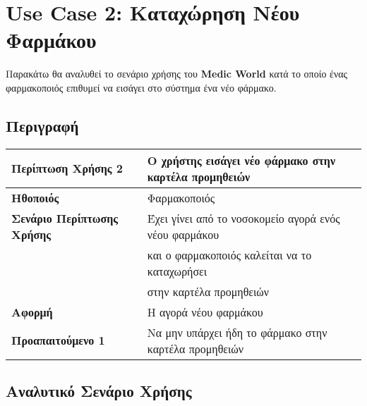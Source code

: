 \documentclass{article}
\newcommand\T{\rule{0pt}{2.6ex}}       %
\newcommand\B{\rule[-1.2ex]{0pt}{0pt}}
\begin{document}
\newpage

\section{Use Case 2: Καταχώρηση Νέου Φαρμάκου }
 
 Παρακάτω θα αναλυθεί το σενάριο χρήσης του \textbf{Medic World} κατά το οποίο ένας φαρμακοποιός επιθυμεί να εισάγει στο σύστημα ένα νέο φάρμακο.
 
\subsection{Περιγραφή}

\begin{center}
     \begin{tabular}{|l|l|}
     \hline
      \textbf{Περίπτωση Χρήσης 2} & Ο χρήστης εισάγει νέο φάρμακο στην καρτέλα προμηθειών \T\B \\ 
      \hline
      \textbf{Ηθοποιός} & Φαρμακοποιός \T\B \\
      \hline
      \textbf{Σενάριο Περίπτωσης Χρήσης} & Έχει γίνει από το νοσοκομείο αγορά ενός νέου φαρμάκου \T \\& και ο φαρμακοποιός καλείται να το καταχωρήσει \\& στην καρτέλα προμηθειών \B \\
      \hline
      \textbf{Αφορμή} & Η αγορά νέου φαρμάκου \T\B \\
      \hline
      \textbf{Προαπαιτούμενο 1} &  Να μην υπάρχει ήδη το φάρμακο στην καρτέλα προμηθειών \T\B \\
      \hline
     \end{tabular}
 \end{center}
 
   \subsection{Αναλυτικό Σενάριο Χρήσης}
 
\end{document}
